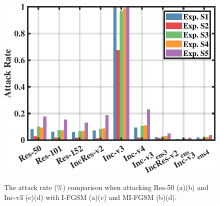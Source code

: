 \documentclass[letterpaper]{article} %
\begin{document}
\begin{figure}[tb]
{\begin{minipage}[t]{0.235\textwidth}
\includegraphics[width = 1\textwidth]{single_attack_rate_IFGSM_Incv3_cropped.pdf}
\end{minipage}
\label{fig:IFGSM_Incv3}
}
\caption{The attack rate (\%) comparison when attacking Res-50 (a)(b) and Inc-v3 (c)(d) with I-FGSM (a)(c) and MI-FGSM (b)(d).}
\label{fig:SingleAttackRate}
\end{figure}
\end{document}
